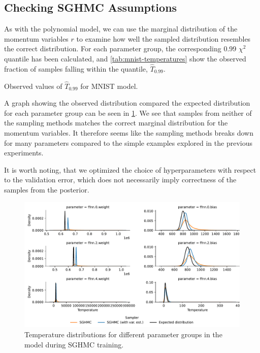 \subsection{Checking SGHMC Assumptions}
As with the polynomial model, we can use the marginal distribution of the momentum variables $r$ to examine how well the sampled distribution resembles the correct distribution.
For each parameter group, the corresponding 0.99 $\chi^2$ quantile has been calculated, and \cref{tab:mnist-temperatures} show the observed fraction of samples falling within the quantile, $\hat{T}_{0.99}$.
\begin{table}[htbp]
    \centering
    
    \caption{Observed values of $\hat{T}_{0.99}$ for MNIST model.}
    \label{tab:mnist-temperatures}
\end{table}
A graph showing the observed distribution compared the expected distribution for each parameter group can be seen in \cref{fig:mnist-temperatures}. 
We see that samples from neither of the sampling methods matches the correct marginal distribution for the momentum variables. 
It therefore seems like the sampling methods breaks down for many parameters compared to the simple examples explored in the previous experiments.

It is worth noting, that we optimized the choice of hyperparameters with respect to the validation error, which does not necessarily imply correctness of the samples from the posterior. 
\begin{figure}[htbp]
    \centering
    \includegraphics[width=\linewidth]{Figures/mnist-temperatures.pdf}
    \caption{Temperature distributions for different parameter groups in the model during SGHMC training.}
    \label{fig:mnist-temperatures}
\end{figure}

